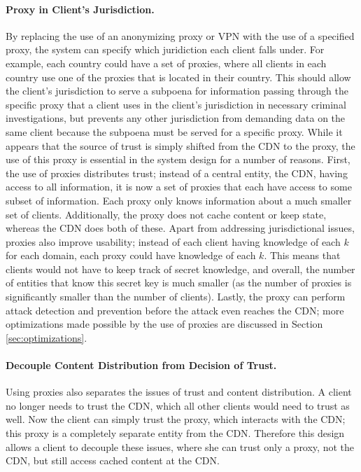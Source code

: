 \paragraph{Proxy in Client's Jurisdiction.} By replacing the use of an anonymizing proxy or VPN with the use 
of a specified proxy, the system can specify which juridiction each client falls under.  For example, 
each country could have a set of proxies, where all clients in each country use one of the proxies that 
is located in their country.  This should allow the client's jurisdiction to serve a subpoena for information 
passing through the specific proxy that a client uses in the client's jurisdiction in 
necessary criminal investigations, but prevents any other jurisdiction from demanding data on the same 
client because the subpoena must be served for a specific proxy.  While it appears that the source of 
trust is simply shifted from the CDN to the proxy, the use of this proxy is essential in 
the system design for a number of reasons.  First, the use of proxies distributes trust; instead of a 
central entity, the CDN, having access to all information, it is now a set of proxies that each have 
access to some subset of information.  Each proxy only knows information about a much smaller set of clients.  
Additionally, the proxy does not cache content or keep state, whereas the CDN does both of these.  Apart 
from addressing jurisdictional issues, proxies also improve usability; instead of each client having knowledge 
of each $k$ for each domain, each proxy could have knowledge of each $k$.  This means that clients would 
not have to keep track of secret knowledge, and overall, the number of entities that know this secret key 
is much smaller (as the number of proxies is significantly smaller than the number of clients).  Lastly, 
the proxy can perform attack detection and prevention before the attack even reaches the CDN; more optimizations 
made possible by the use of proxies are discussed in Section \ref{sec:optimizations}.

\paragraph{Decouple Content Distribution from Decision of Trust.} Using proxies also separates the issues of 
trust and content distribution.  A client no longer needs to trust the CDN, which all other clients would 
need to trust as well.  Now the client can simply trust the proxy, which interacts with the CDN; this proxy 
is a completely separate entity from the CDN.  Therefore this design allows a client to decouple these 
issues, where she can trust only a proxy, not the CDN, but still access cached content at the CDN.

